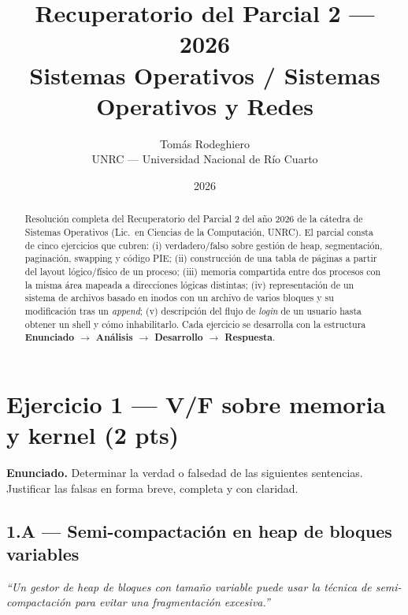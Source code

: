 \documentclass[11pt,a4paper]{article}
\title{
    \vspace{-2.5em}
    \textbf{Recuperatorio del Parcial 2 --- 2026} \\[0.3em]
    \large Sistemas Operativos / Sistemas Operativos y Redes
}
\author{
    Tomás Rodeghiero \\
    \small UNRC --- Universidad Nacional de Río Cuarto
}
\date{2026}
\begin{document}
\maketitle

\begin{abstract}
\noindent
Resolución completa del Recuperatorio del Parcial 2 del año 2026 de
la cátedra de Sistemas Operativos (Lic.\ en Ciencias de la
Computación, UNRC). El parcial consta de cinco ejercicios que cubren:
(i) verdadero/falso sobre gestión de heap, segmentación, paginación,
swapping y código PIE; (ii) construcción de una tabla de páginas a
partir del layout lógico/físico de un proceso; (iii) memoria
compartida entre dos procesos con la misma área mapeada a
direcciones lógicas distintas; (iv) representación de un sistema de
archivos basado en inodos con un archivo de varios bloques y su
modificación tras un \emph{append}; (v) descripción del flujo de
\emph{login} de un usuario hasta obtener un shell y cómo
inhabilitarlo. Cada ejercicio se desarrolla con la estructura
\textbf{Enunciado $\to$ Análisis $\to$ Desarrollo $\to$ Respuesta}.
\end{abstract}

\tableofcontents
\bigskip

\section{Ejercicio 1 --- V/F sobre memoria y kernel (2 pts)}

\textbf{Enunciado.} Determinar la verdad o falsedad de las siguientes
sentencias. Justificar las falsas en forma breve, completa y con
claridad.

\subsection*{1.A --- Semi-compactación en heap de bloques variables}

\emph{``Un gestor de heap de bloques con tamaño variable puede usar
la técnica de semi-compactación para evitar una fragmentación
excesiva.''}
\end{document}
